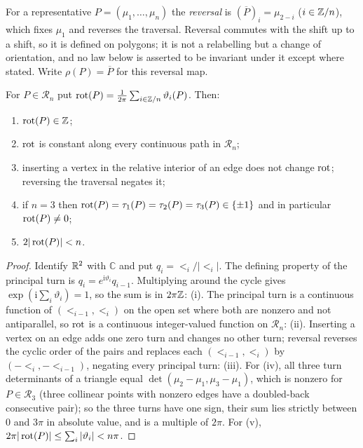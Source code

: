 \begin{definition}[reversal]\label{def:shift}
For a representative $P=(\mu_1,\ldots,\mu_n)$ the \emph{reversal} is
$(\overline P)_i=\mu_{2-i}$ ($i\in\mathbb Z/n$), which fixes $\mu_1$ and reverses
the traversal. Reversal commutes with the shift up
to a shift, so it is defined on polygons; it is not a relabelling but a change
of orientation, and no law below is asserted to be invariant under it except
where stated. Write $\rho(P)=\overline P$ for this reversal map.
\end{definition}

\begin{lemma}\label{lem:rot}
For $P\in\mathcal R_n$ put $\operatorname{rot}(P)=\frac1{2\pi}\sum_{i\in\mathbb Z/n}\vartheta_i(P)$.
Then:
\begin{enumerate}
\item[(i)] $\operatorname{rot}(P)\in\mathbb Z$;
\item[(ii)] $\operatorname{rot}$ is constant along every continuous path in $\mathcal R_n$;
\item[(iii)] inserting a vertex in the relative interior of an edge does not
change $\operatorname{rot}$; reversing the traversal negates
it;
\item[(iv)] if $n=3$ then $\operatorname{rot}(P)=\tau_1(P)=\tau_2(P)=\tau_3(P)\in\{\pm1\}$
and in particular $\operatorname{rot}(P)\neq0$;
\item[(v)] $2|\operatorname{rot}(P)|<n$.
\end{enumerate}
\end{lemma}
\begin{proof}
Identify $\mathbb R^2$ with $\mathbb C$ and put $q_i=\lt_i/|\lt_i|$. The defining
property of the principal turn is $q_i=e^{\mathrm i\vartheta_i}q_{i-1}$.
Multiplying around the cycle gives $\exp(\mathrm i\sum_i\vartheta_i)=1$, so
the sum is in $2\pi\mathbb Z$: (i). The principal turn is a continuous function of
$(\lt_{i-1},\lt_i)$ on the open set where both are nonzero and not
antiparallel, so $\operatorname{rot}$ is a continuous integer-valued function on
$\mathcal R_n$: (ii). Inserting a vertex on an edge adds one zero turn and
changes no other turn; reversal reverses the cyclic order of the pairs and
replaces each $(\lt_{i-1},\lt_i)$ by $(-\lt_i,-\lt_{i-1})$, negating every
principal turn: (iii). For (iv), all three turn determinants of a triangle
equal $\det(\mu_2-\mu_1,\mu_3-\mu_1)$, which is nonzero for $P\in\mathcal R_3$
(three collinear points with nonzero edges have a doubled-back consecutive
pair); so the three turns have one sign, their sum lies strictly between $0$
and $3\pi$ in absolute value, and is a multiple of $2\pi$. For (v),
$2\pi|\operatorname{rot}(P)|\leq\sum_i|\vartheta_i|<n\pi$.
\end{proof}

